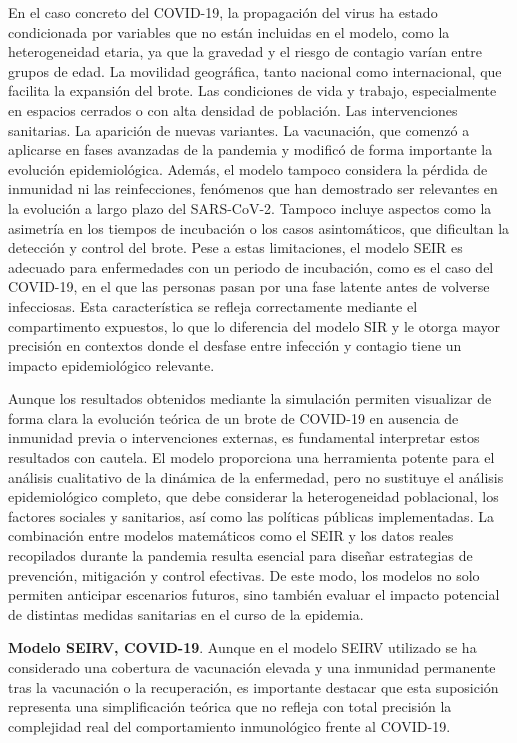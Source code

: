 En el caso concreto del COVID-19, la propagación del virus ha estado condicionada por variables que no están incluidas en el modelo, como la heterogeneidad etaria, ya que la gravedad y el riesgo de contagio varían entre grupos de edad. La movilidad geográfica, tanto nacional como internacional, que facilita la expansión del brote. Las condiciones de vida y trabajo, especialmente en espacios cerrados o con alta densidad de población. Las intervenciones sanitarias. La aparición de nuevas variantes. La vacunación, que comenzó a aplicarse en fases avanzadas de la pandemia y modificó de forma importante la evolución epidemiológica.
Además, el modelo tampoco considera la pérdida de inmunidad ni las reinfecciones, fenómenos que han demostrado ser relevantes en la evolución a largo plazo del SARS-CoV-2. Tampoco incluye aspectos como la asimetría en los tiempos de incubación o los casos asintomáticos, que dificultan la detección y control del brote.
Pese a estas limitaciones, el modelo SEIR es adecuado para enfermedades con un periodo de incubación, como es el caso del COVID-19, en el que las personas pasan por una fase latente antes de volverse infecciosas. Esta característica se refleja correctamente mediante el compartimento expuestos, lo que lo diferencia del modelo SIR y le otorga mayor precisión en contextos donde el desfase entre infección y contagio tiene un impacto epidemiológico relevante.

Aunque los resultados obtenidos mediante la simulación permiten visualizar de forma clara la evolución teórica de un brote de COVID-19 en ausencia de inmunidad previa o intervenciones externas, es fundamental interpretar estos resultados con cautela. El modelo proporciona una herramienta potente para el análisis cualitativo de la dinámica de la enfermedad, pero no sustituye el análisis epidemiológico completo, que debe considerar la heterogeneidad poblacional, los factores sociales y sanitarios, así como las políticas públicas implementadas.
La combinación entre modelos matemáticos como el SEIR y los datos reales recopilados durante la pandemia resulta esencial para diseñar estrategias de prevención, mitigación y control efectivas. De este modo, los modelos no solo permiten anticipar escenarios futuros, sino también evaluar el impacto potencial de distintas medidas sanitarias en el curso de la epidemia.

\vspace{2em}

\textbf{Modelo SEIRV, COVID-19}. Aunque en el modelo SEIRV utilizado se ha considerado una cobertura de vacunación elevada y una inmunidad permanente tras la vacunación o la recuperación, es importante destacar que esta suposición representa una simplificación teórica que no refleja con total precisión la complejidad real del comportamiento inmunológico frente al COVID-19.

